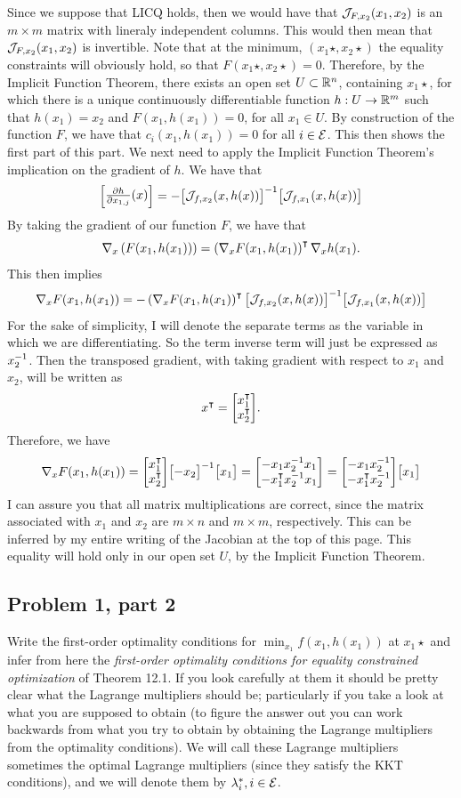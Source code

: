 \begin{solution}
    Since we suppose that LICQ holds, then we would have that $\mathcal{J}_{F, x_2}(x_1, x_2)$ is an $m \times m$ matrix with lineraly independent columns. This would then mean that $\mathcal{J}_{F, x_2}(x_1, x_2)$ is invertible. Note that at the minimum, $(x_1\star, x_2\star)$ the equality constraints will obviously hold, so that $F(x_1\star, x_2\star) = 0$. Therefore, by the Implicit Function Theorem, there exists an open set $U \subset \mathbb{R}^n$, containing $x_1\star$, for which there is a unique continuously differentiable function $h: U \rightarrow \mathbb{R}^m$ such that $h(x_1) = x_2$ and $F(x_1, h(x_1)) = 0$, for all $x_1 \in U$. By construction of the function $F$, we have that $c_i(x_1, h(x_1)) = 0 $ for all $i \in \mathcal{E}$. This then shows the first part of this part. We next need to apply the Implicit Function Theorem's implication on the gradient of $h$. We have that 
    \[\mqty[\frac{\partial h}{\partial x_{1, j}}(x)] = -\mqty[\scJ_{f, x_2}(x, h(x))]\inv \mqty[\scJ_{f, x_1}(x, h(x))]\] 
    By taking the gradient of our function $F$, we have that
    \[\nabla_x \left(F(x_1, h(x_1))\right) = \left( \nabla_xF(x_1, h(x_1)\right)^{\intercal} \nabla_x h(x_1).\]
    This then implies
    \[\grad_x F(x_1, h(x_1)) =  -\left( \grad_xF(x_1, h(x_1)\right)\T \mqty[\scJ_{f, x_2}(x, h(x))]\inv \mqty[\scJ_{f, x_1}(x, h(x))]\]
    For the sake of simplicity, I will denote the separate terms as the variable in which we are differentiating. So the term inverse term will just be expressed as $x_2^{-1}$. Then the transposed gradient, with taking gradient with respect to $x_1$ and $x_2$, will be written as 
    \[x\T = \mqty[x_1\T \\x_2\T].\]
    Therefore, we have 
    \[\grad_x F(x_1, h(x_1)) = \mqty[x_1\T \\x_2\T] \mqty[-x_2]\inv \mqty[x_1] = \mqty[-x_1x_2\inv x_1\\-x_1\T x_2\inv x_1] = \mqty[-x_1x_2\inv \\-x_1\T x_2\inv]\mqty[x_1]\]
    I can assure you that all matrix multiplications are correct, since the matrix associated with $x_1$ and $x_2$ are $m \times n$ and $m \times m$, respectively. This can be inferred by my entire writing of the Jacobian at the top of this page. This equality will hold only in our open set $U$, by the Implicit Function Theorem.
\end{solution}
\newpage
\subsection{Problem 1, part 2}
Write the first-order optimality conditions for $\min_{x_1} f(x_1, h(x_1))$ at $x_1\star$ and infer from here the \textit{first-order optimality conditions for equality constrained optimization} of Theorem 12.1. If you look carefully at them it should be pretty clear what the Lagrange multipliers should be; particularly if you take a look at what you are supposed to obtain (to figure the answer out you can work backwards from what you try to obtain by obtaining the Lagrange multipliers from the optimality 
conditions). We will call these Lagrange multipliers sometimes the optimal Lagrange multipliers (since they satisfy the KKT conditions), and we will denote them by $\mathrm{\lambda}_i^{*}, i \in \mathcal{E}$.


